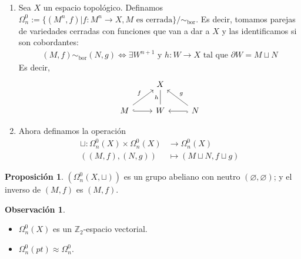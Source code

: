 \documentclass[spanish]{book}
\theoremstyle{definition}
\newtheorem*{obs}{Observación}
\newtheorem*{prop}{Proposición}
\newcommand{\Z}{\mathbb{Z}}
\begin{document}
\begin{enumerate}
	\item Sea $X$ un espacio topológico. Definamos $\Omega^0_n:=\{(M^n,f)|f:M^n\to X, M\text{ es cerrada}\}\Big/\sim_{\operatorname{bor}}$. Es decir, tomamos parejas de variedades cerradas con funciones que van a dar a $X$ y las identificamos si son cobordantes:
	\begin{align*}
		(M,f)\sim_{\operatorname{bor}}(N,g)\iff \exists W^{n+1}\text{ y } h:W\to X\text{ tal que } \partial W=M\sqcup N
	\end{align*}
	Es decir,
	\[\begin{tikzcd}
		&X\\
		M\arrow[ur,"f"]\arrow[r,hook]&W\arrow[u,dash,"h"]&N\arrow[l,hook]\arrow[ul,"g",swap]
	\end{tikzcd}\]
	\item Ahora definamos la operación
	\begin{align*}
		\sqcup:\Omega^0_n(X)\times\Omega^0_n(X)&\to\Omega^0_n(X)\\
		((M,f),(N,g))&\mapsto(M\sqcup N,f\sqcup g)
	\end{align*}
\end{enumerate}
	\begin{prop}
		$(\Omega^0_n(X,\sqcup))$ es un grupo abeliano con neutro $(\varnothing,\varnothing)$; y el inverso de $(M,f)$ es $(M,f)$.
	\end{prop}
	\begin{obs}
		\begin{itemize}
			\item $\Omega_n^0(X)$ es un $\Z_2$-espacio vectorial.
			\item $\Omega^0_n(pt)\approx\Omega^0_n$.
		\end{itemize}
	\end{obs}
	
\end{document}
